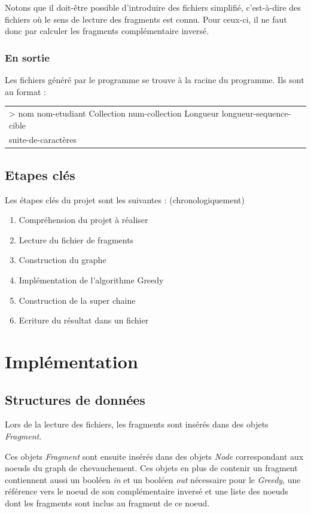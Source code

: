 \documentclass[12pt,a4paper,final]{article}
\begin{document}
Notons que il doit-être possible d'introduire des fichiers simplifié, c'est-à-dire des fichiers où le sens de lecture des fragments est connu. Pour ceux-ci, il ne faut donc par calculer les fragments complémentaire inversé.

\subsubsection{En sortie}
Les fichiers généré par le programme se trouve à la racine du programme. Ils sont au format : 

\begin{table}[!ht]
\centering
\begin{tabular}{|l|}
	\hline
	> nom nom-etudiant Collection num-collection Longueur longueur-sequence-cible \\
	suite-de-caractères\\
	\hline
\end{tabular}
\end{table}

\newpage
\subsection{Etapes clés}
Les étapes clés du projet sont les suivantes : (chronologiquement)
\begin{enumerate}
\item Compréhension du projet à réaliser
\item Lecture du fichier de fragments
\item Construction du graphe
\item Implémentation de l'algorithme Greedy 
\item Construction de la super chaine 
\item Ecriture du résultat dans un fichier
\end{enumerate}

\newpage
\section{Implémentation}
\subsection{Structures de données}

Lors de la lecture des fichiers, les fragments sont insérés dans des objets \textit{Fragment}.\medskip

Ces objets \textit{Fragment} sont ensuite insérés dans des objets \textit{Node} correspondant aux noeuds du graph de chevauchement.  Ces objets en plus de contenir un fragment contiennent aussi un booléen \textit{in} et un booléen \textit{out} nécessaire pour le \textit{Greedy}, une référence vers le noeud de son complémentaire inversé et une liste des noeuds dont les fragments sont inclus au fragment de ce noeud.\medskip
\end{document}
